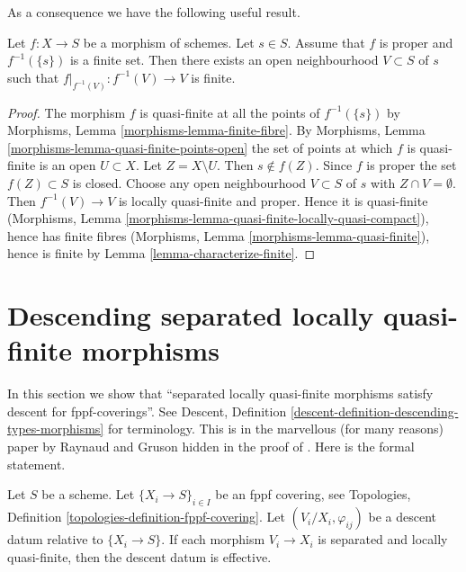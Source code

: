 \noindent
As a consequence we have the following useful result.

\begin{lemma}
\label{lemma-proper-finite-fibre-finite-in-neighbourhood}
Let $f : X \to S$ be a morphism of schemes.
Let $s \in S$.
Assume that $f$ is proper and $f^{-1}(\{s\})$ is a finite set.
Then there exists an open neighbourhood $V \subset S$ of $s$
such that $f|_{f^{-1}(V)} : f^{-1}(V) \to V$ is finite.
\end{lemma}

\begin{proof}
The morphism $f$ is quasi-finite at all the points of $f^{-1}(\{s\})$
by Morphisms, Lemma \ref{morphisms-lemma-finite-fibre}.
By Morphisms, Lemma \ref{morphisms-lemma-quasi-finite-points-open} the
set of points at which $f$ is quasi-finite is an open $U \subset X$.
Let $Z = X \setminus U$. Then $s \not \in f(Z)$. Since $f$ is proper
the set $f(Z) \subset S$ is closed. Choose any open neighbourhood
$V \subset S$ of $s$ with $Z \cap V = \emptyset$. Then
$f^{-1}(V) \to V$ is locally quasi-finite and proper.
Hence it is quasi-finite
(Morphisms, Lemma \ref{morphisms-lemma-quasi-finite-locally-quasi-compact}),
hence has finite fibres
(Morphisms, Lemma \ref{morphisms-lemma-quasi-finite}), hence
is finite by Lemma \ref{lemma-characterize-finite}.
\end{proof}






\section{Descending separated locally quasi-finite morphisms}
\label{section-separated-locally-quasi-finite}

\noindent
In this section we show that ``separated locally quasi-finite morphisms
satisfy descent for fppf-coverings''. See Descent, Definition
\ref{descent-definition-descending-types-morphisms} for terminology.
This is in the marvellous
(for many reasons) paper by Raynaud and Gruson hidden in the proof
of \cite[Lemma 5.7.1]{GruRay}. Here is the formal statement.

\begin{lemma}
\label{lemma-separated-locally-quasi-finite-morphisms-fppf-descend}
Let $S$ be a scheme.
Let $\{X_i \to S\}_{i\in I}$ be an fppf covering, see
Topologies, Definition \ref{topologies-definition-fppf-covering}.
Let $(V_i/X_i, \varphi_{ij})$ be a descent datum
relative to $\{X_i \to S\}$. If each morphism
$V_i \to X_i$ is separated and locally quasi-finite,
then the descent datum is effective.
\end{lemma}

